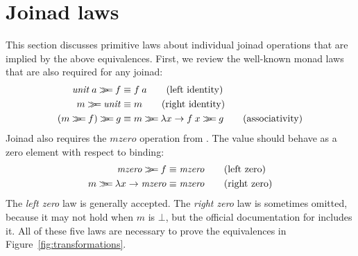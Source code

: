 \documentclass{sigplanconf}
\newcommand{\Varid}[1]{\mathit{#1}}
\newcommand{\bind}{\mathbin{>\!\!\!>\mkern-6.7mu=}}
\begin{document}

\section{Joinad laws}
\label{sec:laws}

This section discusses primitive laws about individual joinad operations that are 
implied by the above equivalences. First, we review the well-known monad laws that 
are also required for any joinad:
\begin{align*}
\munit \: a \bind f &\equiv f \: a \tag{left identity} \\
m \bind \munit &\equiv m \tag{right identity} \\
(m \bind f) \bind g &\equiv m \bind \lambda x \rightarrow f \: x \bind g \tag{associativity}
\end{align*}
Joinad also requires the \ensuremath{\Varid{mzero}} operation from . The value should behave as a 
zero element with respect to binding:
\begin{align*}
\mzero \bind f &\equiv \mzero \tag {left zero} \\
m \bind \lambda x \rightarrow \mzero &\equiv \mzero \tag{right zero}
\end{align*}
The \textit{left zero} law is generally accepted. The \textit{right zero} law is sometimes omitted, 
because it may not hold when $m$ is $\bot$, but the official documentation for 
\cite{monadplusdoc} includes it. All of these five laws are necessary to prove the 
equivalences in Figure~\ref{fig:transformations}.

\end{document}
